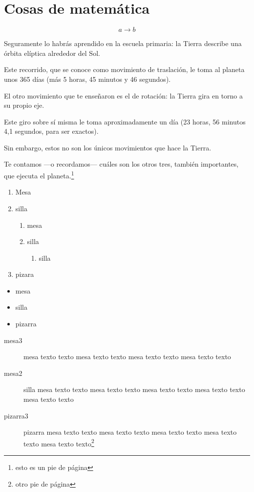 \documentclass{report}
\begin{document}
\setcounter{chapter}{4}

\chapter{Cosas de matemática}


\[
a\longrightarrow b
\]

Seguramente lo habrás aprendido en la escuela primaria: la Tierra describe una órbita elíptica alrededor del Sol.

Este recorrido, que se conoce como movimiento de traslación, le toma al planeta unos 365 días 
(más 5 horas, 45 minutos y 46 segundos).

El otro movimiento que te enseñaron es el de rotación: la Tierra gira en torno a su propio eje.

Este giro sobre sí misma le toma aproximadamente un día (23 horas, 56 minutos 4,1 segundos, para ser exactos). 

Sin embargo, estos no son los únicos movimientos que hace la Tierra.

Te contamos —o recordamos— cuáles son los otros tres, también importantes, que ejecuta el planeta.\footnote{esto es un pie de página}


\begin{enumerate}
	\item Mesa
	\item silla
	\begin{enumerate}
		\item mesa
		\item silla
		\begin{enumerate}
			\item silla
		\end{enumerate}
	\end{enumerate}
	\item pizara
\end{enumerate}

\begin{itemize}
	\item mesa
	\item silla
	\item pizarra
\end{itemize}


\begin{description}
	\item[mesa3] mesa texto texto mesa texto texto mesa texto texto mesa texto texto
	\item[mesa2] silla mesa texto texto mesa texto texto mesa texto texto mesa texto texto mesa texto texto
	\item[pizarra3] pizarra mesa texto texto mesa texto texto mesa texto texto mesa texto texto mesa texto texto\footnote{otro pie de página }
\end{description}
\end{document}
